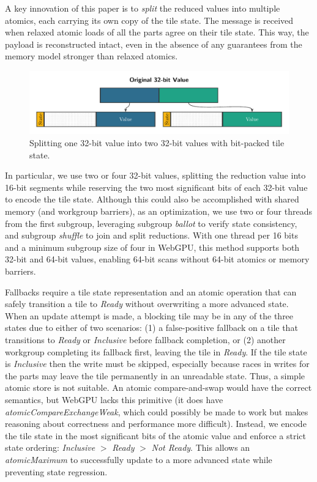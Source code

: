 \documentclass[sigconf,screen]{acmart}
\begin{document}
A key innovation of this paper is to \emph{split} the reduced values into multiple atomics, each carrying its own copy of the tile state. The message is received when relaxed atomic loads of all the parts agree on their tile state. This way, the payload is reconstructed intact, even in the absence of any guarantees from the memory model stronger than relaxed atomics.

\begin{figure}[h!]
  \centering
  \includegraphics[width=1.03\linewidth]{graphics/split.pdf}
  \caption{Splitting one 32-bit value into two 32-bit values with bit-packed tile state.}
\end{figure}

In particular, we use two or four 32-bit values, splitting the reduction value into 16-bit segments while reserving the two most significant bits of each 32-bit value to encode the tile state. Although this could also be accomplished with shared memory (and workgroup barriers), as an optimization, we use two or four threads from the first subgroup, leveraging subgroup \emph{ballot} to verify state consistency, and subgroup \emph{shuffle} to join and split reductions. With one thread per 16 bits and a minimum subgroup size of four in WebGPU, this method supports both 32-bit and 64-bit values, enabling 64-bit scans without 64-bit atomics or memory barriers.

Fallbacks require a tile state representation and an atomic operation that can safely transition a tile to \emph{Ready} without overwriting a more advanced state. When an update attempt is made, a blocking tile may be in any of the three states due to either of two scenarios: (1) a false-positive fallback on a tile that transitions to \emph{Ready} or \emph{Inclusive} before fallback completion, or (2) another workgroup completing its fallback first, leaving the tile in \emph{Ready}. If the tile state is \emph{Inclusive} then the write must be skipped, especially because races in writes for the parts may leave the tile permanently in an unreadable state. Thus, a simple atomic store is not suitable. An atomic compare-and-swap would have the correct semantics, but WebGPU lacks this primitive (it does have \emph{atomicCompareExchangeWeak}, which could possibly be made to work but makes reasoning about correctness and performance more difficult). Instead, we encode the tile state in the most significant bits of the atomic value and enforce a strict state ordering: \emph{Inclusive} $>$ \emph{Ready} $>$ \emph{Not Ready}. This allows an \emph{atomicMaximum} to successfully update to a more advanced state while preventing state regression.
\end{document}
